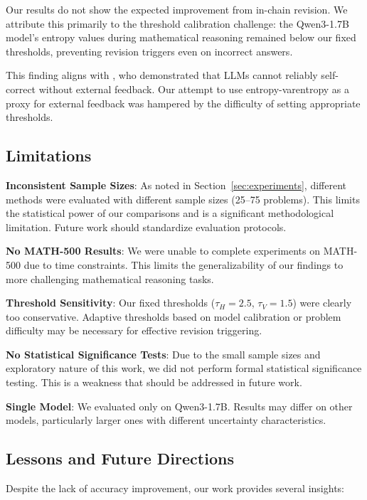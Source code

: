 \documentclass{article}
\begin{document}
Our results do not show the expected improvement from in-chain revision. We attribute this primarily to the threshold calibration challenge: the Qwen3-1.7B model's entropy values during mathematical reasoning remained below our fixed thresholds, preventing revision triggers even on incorrect answers.

This finding aligns with \citet{huang2024selfcorrect}, who demonstrated that LLMs cannot reliably self-correct without external feedback. Our attempt to use entropy-varentropy as a proxy for external feedback was hampered by the difficulty of setting appropriate thresholds.

\subsection{Limitations}

\textbf{Inconsistent Sample Sizes}: As noted in Section~\ref{sec:experiments}, different methods were evaluated with different sample sizes (25--75 problems). This limits the statistical power of our comparisons and is a significant methodological limitation. Future work should standardize evaluation protocols.

\textbf{No MATH-500 Results}: We were unable to complete experiments on MATH-500 due to time constraints. This limits the generalizability of our findings to more challenging mathematical reasoning tasks.

\textbf{Threshold Sensitivity}: Our fixed thresholds ($\tau_H=2.5$, $\tau_V=1.5$) were clearly too conservative. Adaptive thresholds based on model calibration or problem difficulty may be necessary for effective revision triggering.

\textbf{No Statistical Significance Tests}: Due to the small sample sizes and exploratory nature of this work, we did not perform formal statistical significance testing. This is a weakness that should be addressed in future work.

\textbf{Single Model}: We evaluated only on Qwen3-1.7B. Results may differ on other models, particularly larger ones with different uncertainty characteristics.

\subsection{Lessons and Future Directions}

Despite the lack of accuracy improvement, our work provides several insights:
\end{document}

